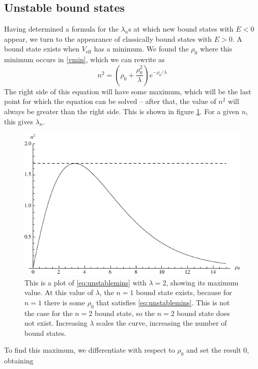 \documentclass[12pt,twoside]{reedthesis}
\begin{document}
\subsection{Unstable bound states}

Having determined a formula for the $\lambda_n$s at which new bound states with $E < 0$ appear, we turn to the appearance of classically bound states with $E > 0$. A bound state exists when $V_{\mathrm{eff}}$ has a minimum. We found the $\rho_0$ where this minimum occurs in \eqref {vmin}, which we can rewrite as
\begin{equation}
n^2 = \left( \rho_0 + \frac{\rho_0^2}{\lambda} \right) e^{-\rho_0/\lambda}
\label{eq:unstablemins}
\end{equation}
The right side of this equation will have some maximum, which will be the last point for which the equation can be solved -- after that, the value of $n^2$ will always be greater than the right side. This is shown in figure \ref{fig:unstableveff}. For a given $n$, this gives $\lambda_n$.
\begin{figure}[h]
\centering
\includegraphics{Figures/unstableveff}
\caption[$n^2$ as a function of $\rho_0$]{This is a plot of \eqref{eq:unstablemins} with $\lambda = 2$, showing its maximum value. At this value of $\lambda$, the $n = 1$ bound state exists, because for $n = 1$ there is some $\rho_0$ that satisfies \eqref{eq:unstablemins}. This is not the case for the $n = 2$ bound state, so the $n = 2$ bound state does not exist. Increasing $\lambda$ scales the curve, increasing the number of bound states.}
\label{fig:unstableveff}
\end{figure}
To find this maximum, we differentiate with respect to $\rho_0$ and set the result 0, obtaining
\end{document}
